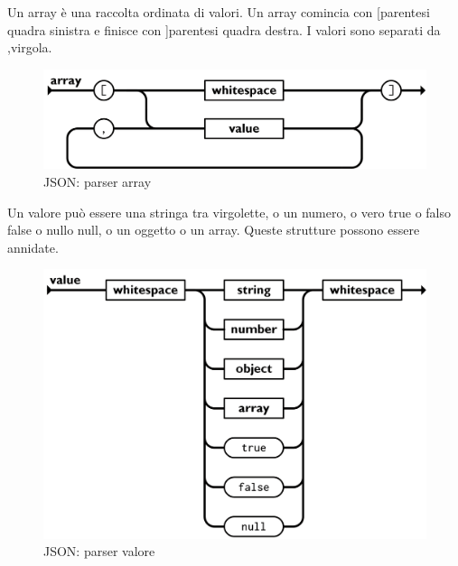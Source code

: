 \documentclass[11pt,a4paper]{book}
\begin{document}
\clearpage
Un array è una raccolta ordinata di valori. Un array comincia con [parentesi quadra sinistra e finisce con ]parentesi quadra destra. I valori sono separati da ,virgola.
\begin{figure}[h!]
	\begin{center}
		\includegraphics[scale=0.6]{img/003.png}
		\caption{JSON: parser array}
		\label{fig: 003}
	\end{center}
\end{figure}

\clearpage
Un valore può essere una stringa tra virgolette, o un numero, o vero true o falso false o nullo null, o un oggetto o un array. Queste strutture possono essere annidate.
\begin{figure}[h!]
	\begin{center}
		\includegraphics[scale=0.6]{img/004.png}
		\caption{JSON: parser valore}
		\label{fig: 004}
	\end{center}
\end{figure}
\end{document}
